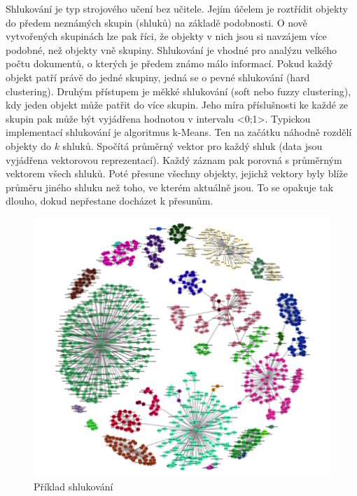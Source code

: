 \documentclass[12pt]{article}
\begin{document}
Shlukování je typ strojového učení bez učitele. Jejím účelem je roztřídit
objekty do předem neznámých skupin (shluků) na základě podobnosti. O nově
vytvořených skupinách lze pak říci, že objekty v nich jsou si navzájem více
podobné, než objekty vně skupiny. Shlukování je vhodné pro analýzu velkého počtu
dokumentů, o kterých je předem známo málo informací. \citep{berry}
\newline
\indent
Pokud každý objekt patří právě do jedné skupiny, jedná se o pevné
shlukování (hard clustering). Druhým přístupem je měkké
shlukování (soft nebo fuzzy clustering), kdy jeden objekt může patřit
do více skupin. Jeho míra příslušnosti ke každé ze skupin pak může být vyjádřena hodnotou v intervalu <0;1>.
\newline
\indent
Typickou implementací shlukování je algoritmus k-Means. Ten na začátku
náhodně rozdělí objekty do $k$ shluků. Spočítá průměrný vektor pro každý
shluk (data jsou vyjádřena vektorovou reprezentací). Každý záznam pak
porovná s průměrným vektorem všech shluků. Poté přesune všechny objekty,
jejichž vektory byly blíže průměru jiného shluku než toho, ve kterém aktuálně jsou.
To se opakuje tak dlouho, dokud nepřestane docházet k přesunům. \citep{weiss}
\begin{figure}
  \centering
  \includegraphics[scale=0.5]{img/clustering.png}
  \caption{Příklad shlukování \citep{clust}}
\end{figure}
\end{document}
